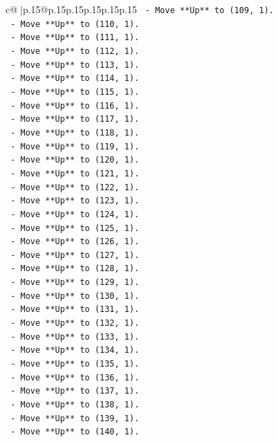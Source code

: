\documentclass{article}
\begin{document}
{\begin{supertabular}{c@{$\;$}|p{.15\linewidth}@{}p{.15\linewidth}p{.15\linewidth}p{.15\linewidth}p{.15\linewidth}p{.15\linewidth}}
{{{\texttt{  {-} Move **Up** to (109, 1).} \\
\texttt{  {-} Move **Up** to (110, 1).} \\
\texttt{  {-} Move **Up** to (111, 1).} \\
\texttt{  {-} Move **Up** to (112, 1).} \\
\texttt{  {-} Move **Up** to (113, 1).} \\
\texttt{  {-} Move **Up** to (114, 1).} \\
\texttt{  {-} Move **Up** to (115, 1).} \\
\texttt{  {-} Move **Up** to (116, 1).} \\
\texttt{  {-} Move **Up** to (117, 1).} \\
\texttt{  {-} Move **Up** to (118, 1).} \\
\texttt{  {-} Move **Up** to (119, 1).} \\
\texttt{  {-} Move **Up** to (120, 1).} \\
\texttt{  {-} Move **Up** to (121, 1).} \\
\texttt{  {-} Move **Up** to (122, 1).} \\
\texttt{  {-} Move **Up** to (123, 1).} \\
\texttt{  {-} Move **Up** to (124, 1).} \\
\texttt{  {-} Move **Up** to (125, 1).} \\
\texttt{  {-} Move **Up** to (126, 1).} \\
\texttt{  {-} Move **Up** to (127, 1).} \\
\texttt{  {-} Move **Up** to (128, 1).} \\
\texttt{  {-} Move **Up** to (129, 1).} \\
\texttt{  {-} Move **Up** to (130, 1).} \\
\texttt{  {-} Move **Up** to (131, 1).} \\
\texttt{  {-} Move **Up** to (132, 1).} \\
\texttt{  {-} Move **Up** to (133, 1).} \\
\texttt{  {-} Move **Up** to (134, 1).} \\
\texttt{  {-} Move **Up** to (135, 1).} \\
\texttt{  {-} Move **Up** to (136, 1).} \\
\texttt{  {-} Move **Up** to (137, 1).} \\
\texttt{  {-} Move **Up** to (138, 1).} \\
\texttt{  {-} Move **Up** to (139, 1).} \\
\texttt{  {-} Move **Up** to (140, 1).} \\
}}}
\end{supertabular}}
\end{document}
